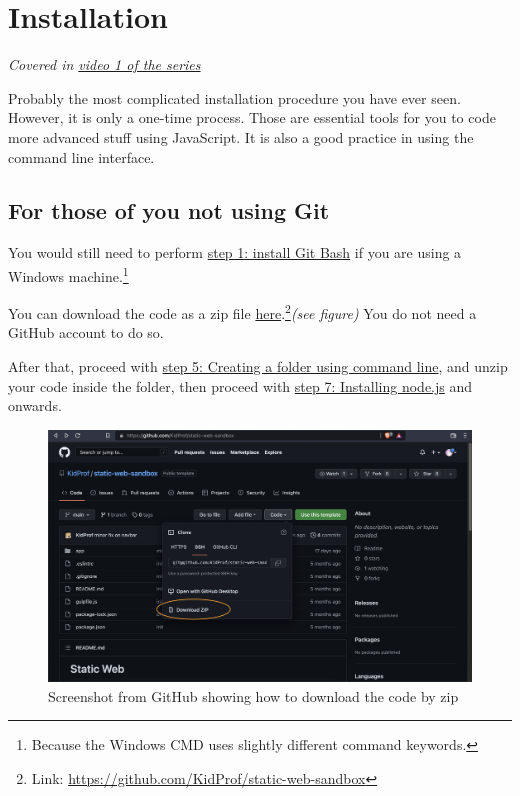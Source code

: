 \chapter{Installation}

\textit{Covered in \href{https://www.youtube.com/watch?v=oIsH0V3fRt8&list=PLjGmdnqrOKuYXiu7lgG5HW71jPEUd1XCm&index=2}{video 1 of the series}}
\vspace{6mm}

Probably the most complicated installation procedure you have ever seen. However, it is only a one-time process. Those are essential tools for you to code more advanced stuff using JavaScript. It is also a good practice in using the command line interface.

\section*{For those of you not using Git}

You would still need to perform \hyperref[sec:install1]{step 1: install Git Bash} if you are using a Windows machine.\footnote{Because the Windows CMD uses slightly different command keywords.}

You can download the code as a zip file \href{https://github.com/KidProf/static-web-sandbox}{here}.\footnote{Link: \url{https://github.com/KidProf/static-web-sandbox}}\textit{(see figure)} You do not need a GitHub account to do so. 

After that, proceed with \hyperref[sec:install5]{step 5: Creating a folder using command line}, and unzip your code inside the folder, then proceed with \hyperref[sec:install7]{step 7: Installing node.js} and onwards.

\begin{figure}[h]
\centering
\includegraphics[width=15cm]{images/ch1-download-as-zip.png}
\caption{Screenshot from GitHub showing how to download the code by zip}
\end{figure}


